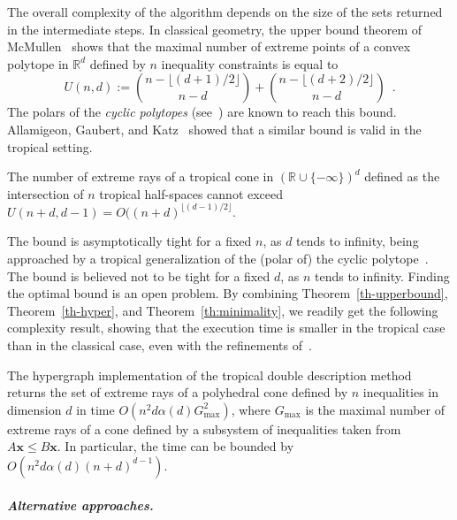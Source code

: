 \documentclass[proceedings]{stacs}
\newcommand{\defin}{:=}\newcommand{\mpzero}{\mathbbb{0}}
\newcommand{\vect}[1]{\boldsymbol #1}
\newcommand{\upperbound}[2]{U(#1,#2)}
\newcommand{\mychoose}[2]{\binom{#1}{#2}}
\newcommand{\R}{\mathbb{R}}
\newcommand{\rbar}{\R\cup\{-\infty\}}
\begin{document}
The overall complexity of the algorithm  depends on the size of the sets returned in the intermediate steps. In classical geometry, the upper bound theorem of McMullen~\cite{mcmullen70} shows that the maximal number of extreme points of a convex polytope in $\mathbb{R}^d$ defined by $n$ inequality constraints is equal to 
\[ \upperbound{n}{d} \defin \mychoose{n-\lfloor (d+1)/2\rfloor}{n-d} + \mychoose{n-\lfloor (d+2)/2\rfloor}{n-d}
\enspace .
\] 
The polars of the \emph{cyclic polytopes} (see~\cite{ziegler98}) are known to reach this bound. Allamigeon, Gaubert, and Katz~\cite{AGK09} showed that a similar bound is valid in the tropical setting.
\begin{theorem}\label{th-upperbound}
The number of extreme rays of a tropical cone in $(\rbar)^d$
defined as the intersection of $n$ tropical half-spaces cannot exceed $U(n+d,d-1)=O((n+d)^{\lfloor (d-1)/2\rfloor }$. 
\end{theorem}
The bound is asymptotically tight for a fixed $n$,
as $d$ tends to infinity, being approached by a tropical generalization of the
(polar of) the cyclic polytope~\cite{AGK09}. The bound is believed not to be tight for a fixed $d$, 
as $n$ tends to infinity.
Finding the optimal bound is an open problem. 
By combining Theorem~\ref{th-upperbound}, Theorem~\ref{th-hyper}, and Theorem~\ref{th:minimality}, we readily get the following complexity result,
showing that the execution time is smaller in the tropical case
than in the classical case, even with the refinements of~\cite{FukudaProdon96}.
\begin{proposition}\label{wc}
The hypergraph implementation of the tropical double description method
returns the set of extreme rays
of a polyhedral cone defined by $n$ inequalities in dimension $d$
in time $O(n^2d\alpha(d)G_{\max}^2)$, where $G_{\max}$ is the
maximal number of extreme rays of a cone defined by a subsystem of inequalities
taken from $A\vect{x}\leq B\vect{x}$. 
In particular, the time can be bounded by $O(n^2 d \alpha(d) (n+d)^{d-1})$.
\end{proposition}








\paragraph{\textit{Alternative approaches.}}
\end{document}
